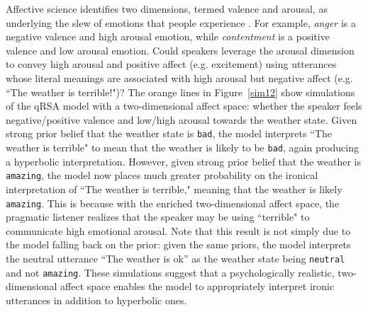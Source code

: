 \documentclass[10pt,letterpaper]{article}
\begin{document}
Affective science identifies two dimensions, termed valence and arousal, as underlying the slew of emotions that people experience \cite{russell1980circumplex}. 
For example, \emph{anger} is a negative valence and high arousal emotion, while \emph{contentment} is a positive valence and low arousal emotion. 
Could speakers leverage the arousal dimension to convey high arousal and positive affect (e.g. excitement) using utterances whose literal meanings are associated with high arousal but negative affect (e.g. ``The weather is terrible!")? The orange lines in Figure~\ref{sim12} show simulations of the qRSA model with a two-dimensional affect space: whether the speaker feels negative/positive valence and low/high arousal towards the weather state. Given strong prior belief that the weather state is \texttt{bad}, the model interprets ``The weather is terrible" to mean that the weather is likely to be \texttt{bad}, again producing a hyperbolic interpretation. However, given strong prior belief that the weather is \texttt{amazing}, the model now places much greater probability on the ironical interpretation of ``The weather is terrible," meaning that the weather is likely \texttt{amazing}. This is because with the enriched two-dimensional affect space, the pragmatic listener realizes that the speaker may be using ``terrible" to communicate high emotional arousal. Note that this result is not simply due to the model falling back on the prior: given the same priors, the model interprets the neutral utterance ``The weather is ok'' as the weather state being \texttt{neutral} and not \texttt{amazing}.
These simulations suggest that a psychologically realistic, two-dimensional affect space enables the model to appropriately interpret ironic utterances in addition to hyperbolic ones. 

\end{document}
